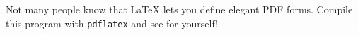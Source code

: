 \documentclass{article}
\begin{document}
Not many people know that \LaTeX{} lets you define elegant PDF forms.
Compile this program with \texttt{pdflatex} and see for yourself!

\begin{Form}[]
 \\
 \\
 \\
\end{Form}
\end{document}
